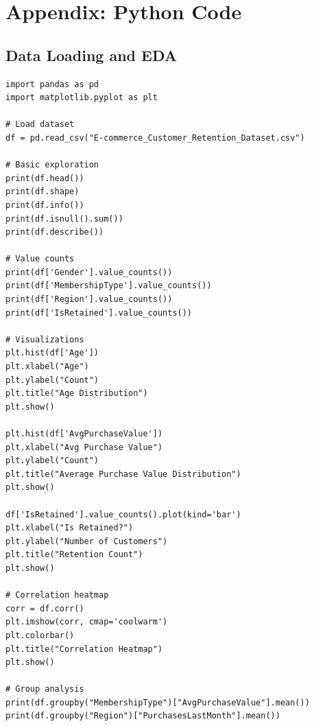 \documentclass[12pt,a4paper]{article}
\begin{document}
\appendix
\section{Appendix: Python Code}

\subsection{Data Loading and EDA}
\begin{lstlisting}
import pandas as pd
import matplotlib.pyplot as plt

# Load dataset
df = pd.read_csv("E-commerce_Customer_Retention_Dataset.csv")

# Basic exploration
print(df.head())
print(df.shape)
print(df.info())
print(df.isnull().sum())
print(df.describe())

# Value counts
print(df['Gender'].value_counts())
print(df['MembershipType'].value_counts())
print(df['Region'].value_counts())
print(df['IsRetained'].value_counts())

# Visualizations
plt.hist(df['Age'])
plt.xlabel("Age")
plt.ylabel("Count")
plt.title("Age Distribution")
plt.show()

plt.hist(df['AvgPurchaseValue'])
plt.xlabel("Avg Purchase Value")
plt.ylabel("Count")
plt.title("Average Purchase Value Distribution")
plt.show()

df['IsRetained'].value_counts().plot(kind='bar')
plt.xlabel("Is Retained?")
plt.ylabel("Number of Customers")
plt.title("Retention Count")
plt.show()

# Correlation heatmap
corr = df.corr()
plt.imshow(corr, cmap='coolwarm')
plt.colorbar()
plt.title("Correlation Heatmap")
plt.show()

# Group analysis
print(df.groupby("MembershipType")["AvgPurchaseValue"].mean())
print(df.groupby("Region")["PurchasesLastMonth"].mean())
\end{lstlisting}
\end{document}
